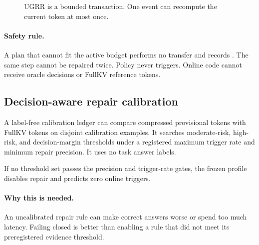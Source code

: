 \documentclass[11pt]{article}
\newcommand{\code}[1]{\texttt{\detokenize{#1}}}
\newcommand{\why}{\paragraph{Why this is needed.}}
\newcommand{\safety}{\paragraph{Safety rule.}}
\begin{document}
\begin{figure}[htbp]
\centering
{}
\caption{UGRR is a bounded transaction. One event can recompute the current token at most once.}
\label{fig:repair}
\end{figure}

\safety A plan that cannot fit the active budget performs no transfer and records
\code{active_budget_infeasible}. The same step cannot be repaired twice. Policy \code{none} never
triggers. Online code cannot receive oracle decisions or FullKV reference tokens.

\subsection{Decision-aware repair calibration}

A label-free calibration ledger can compare compressed provisional tokens with FullKV tokens on
disjoint calibration examples. It searches moderate-risk, high-risk, and decision-margin
thresholds under a registered maximum trigger rate and minimum repair precision. It uses no task
answer labels.

If no threshold set passes the precision and trigger-rate gates, the frozen profile disables
repair and predicts zero online triggers.

\why An uncalibrated repair rule can make correct answers worse or spend too much latency. Failing
closed is better than enabling a rule that did not meet its preregistered evidence threshold.
\end{document}
